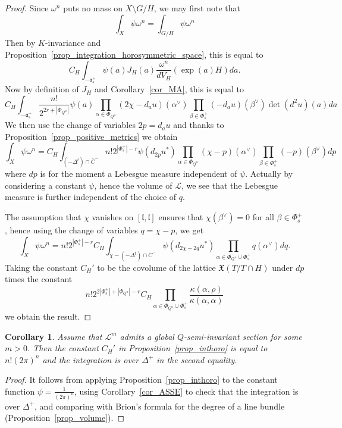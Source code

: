 \documentclass{amsart}
\newtheorem{cor}[thm]{Corollary}
\theoremstyle{definition}
\begin{document}
\begin{proof}
Since $\omega^n$ puts no mass on $X\setminus G/H$, we may first note that 
\[
\int_X\psi\omega^n = \int_{G/H} \psi \omega^n 
\]
Then by $K$-invariance and 
Proposition~\ref{prop_integration_horosymmetric_space}, 
this is equal to 
\[
C_H\int_{-\mathfrak{a}_s^+}\psi(a)J_H(a)\frac{\omega^n}{dV_H}(\exp(a)H)da. 
\]
Now by definition of $J_H$ and Corollary~\ref{cor_MA}, this is equal to 
\[
C_H\int_{-\mathfrak{a}_s^+}  \frac{n!}{2^{2r+|\Phi_{Q^u}|}} \psi(a)
\prod_{\alpha\in\Phi_{Q^u}}(2\chi-d_au)(\alpha^{\vee})   
\prod_{\beta\in\Phi_s^+}(-d_au)(\beta^{\vee}) \det(d^2u)(a)da 
\]
We then use the change of variables $2p=d_au$ and thanks to 
Proposition~\ref{prop_positive_metrics} 
we obtain 
\[
\int_X\psi\omega^n = 
C_H\int_{(-\Delta^t)\cap \bar{C}^-}  n! 2^{|\Phi_s^+|-r} \psi(d_{2p}u^*)
\prod_{\alpha\in\Phi_{Q^u}}(\chi-p)(\alpha^{\vee})   
\prod_{\beta\in\Phi_s^+}(-p)(\beta^{\vee}) dp 
\]
where $dp$ is for the moment a Lebesgue measure independent of $\psi$. 
Actually by considering a constant $\psi$, hence the volume of $\mathcal{L}$, 
we see that the Lebesgue measure is further independent of the choice 
of $q$. 

The assumption that $\chi$ vanishes on $[\mathfrak{l},\mathfrak{l}]$ 
ensures that $\chi(\beta^{\vee})=0$ for all $\beta\in \Phi_s^+$, 
hence using the change of variables $q=\chi-p$, we get 
\[
\int_X\psi\omega^n = 
n! 2^{|\Phi_s^+|-r} C_H\int_{\chi-(-\Delta^t)\cap \bar{C}^-}  \psi(d_{2\chi-2q}u^*)
\prod_{\alpha\in\Phi_{Q^u}\cup \Phi_s^+}q(\alpha^{\vee}) dq. 
\]
Taking the constant $C_H'$ to be the covolume of the lattice 
$\mathfrak{X}(T/T\cap H)$ under $dp$ times the constant 
\[
n! 2^{2|\Phi_s^+|+|\Phi_{Q^u}|-r} C_H \prod_{\alpha\in\Phi_{Q^u}\cup \Phi_s^+}
\frac{\kappa(\alpha,\rho)}{\kappa(\alpha,\alpha)}
\]
we obtain the result.
\end{proof}

\begin{cor}
\label{cor_identify_constant}
Assume that $\mathcal{L}^m$ admits a global $Q$-semi-invariant 
section for some $m>0$. Then the constant $C_H'$ in Proposition~\ref{prop_inthoro} 
is equal to $n!(2\pi)^n$ and the integration is over $\Delta^+$ in the 
second equality.
\end{cor}

\begin{proof}
It follows from applying Proposition~\ref{prop_inthoro} to the constant function 
$\psi=\frac{1}{(2\pi)^n}$, using Corollary~\ref{cor_ASSE} to check that 
the integration is over $\Delta^+$, and comparing 
with Brion's formula for the degree of a line bundle 
(Proposition~\ref{prop_volume}). 
\end{proof}
\end{document}
